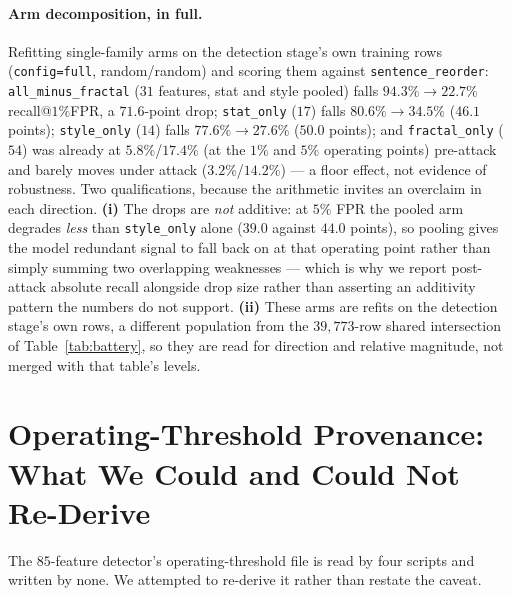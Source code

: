 \documentclass{article}
\newcommand{\arm}[1]{\texttt{#1}}
\begin{document}
\paragraph{Arm decomposition, in full.} Refitting single-family arms on the
detection stage's own training rows (\arm{config=full}, random/random) and
scoring them against \texttt{sentence\_reorder}:
\arm{all\_minus\_fractal} ($31$ features, stat and style pooled) falls
$94.3\%\!\to\!22.7\%$ recall@$1\%$FPR, a $71.6$-point drop;
\arm{stat\_only} ($17$) falls $80.6\%\!\to\!34.5\%$ ($46.1$ points);
\arm{style\_only} ($14$) falls $77.6\%\!\to\!27.6\%$ ($50.0$ points); and
\arm{fractal\_only} ($54$) was already at $5.8\%$/$17.4\%$ (at the $1\%$ and
$5\%$ operating points) pre-attack and barely moves under attack
($3.2\%$/$14.2\%$) --- a floor effect, not evidence of robustness. Two
qualifications, because the arithmetic invites an overclaim in each direction.
\textbf{(i)} The drops are \emph{not} additive: at $5\%$ FPR the pooled arm
degrades \emph{less} than \arm{style\_only} alone ($39.0$ against $44.0$
points), so pooling gives the model redundant signal to fall back on at that
operating point rather than simply summing two overlapping weaknesses --- which
is why we report post-attack absolute recall alongside drop size rather than
asserting an additivity pattern the numbers do not support. \textbf{(ii)} These
arms are refits on the detection stage's own rows, a different population from
the $39{,}773$-row shared intersection of Table~\ref{tab:battery}, so they are
read for direction and relative magnitude, not merged with that table's levels.

\section{Operating-Threshold Provenance: What We Could and Could Not Re-Derive}
\label{app:thresholds}

The $85$-feature detector's operating-threshold file is read by four scripts and
written by none. We attempted to re-derive it rather than restate the caveat.
\end{document}
